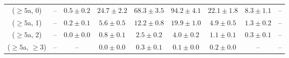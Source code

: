 \begin{table}[h!]
{\begin{tabular}{ccccccccc}
	($\ge5$a, 0) & -- & $0.5\pm 0.2$ & $24.7\pm 2.2$ & $68.3\pm 3.5$ & $94.2\pm 4.1$ & $22.1\pm 1.8$ & $8.3\pm 1.1$ & -- \\[0.5ex] 
	($\ge5$a, 1) & -- & $0.2\pm 0.1$ & $5.6\pm 0.5$ & $12.2\pm 0.8$ & $19.9\pm 1.0$ & $4.9\pm 0.5$ & $1.3\pm 0.2$ & -- \\[0.5ex] 
	($\ge5$a, 2) & -- & $0.0\pm 0.0$ & $0.8\pm 0.1$ & $2.5\pm 0.2$ & $4.0\pm 0.2$ & $1.1\pm 0.1$ & $0.3\pm 0.1$ & -- \\[0.5ex] 
	($\ge5$a, $\ge3$) & -- & -- & $0.0\pm 0.0$ & $0.3\pm 0.1$ & $0.1\pm 0.0$ & $0.2\pm 0.0$ & -- & -- \\[0.5ex] 
	\hline
	\hline
\end{tabular}}
\end{table}
